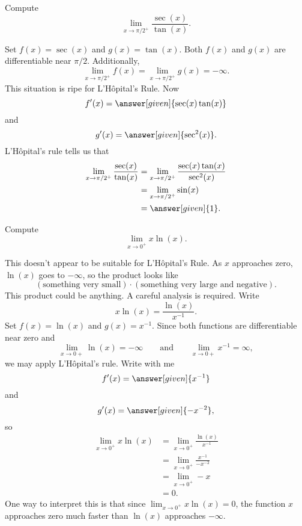 \documentclass{ximera}
\begin{document}
\begin{example}
  Compute 
\[
\lim_{x\to \pi/2^+} \frac{\sec(x)}{\tan(x)}.
\]
\begin{explanation}
Set $f(x) = \sec(x)$ and $g(x) = \tan(x)$. Both $f(x)$ and $g(x)$
are differentiable near $\pi/2$. Additionally,
\[
\lim_{x \to \pi/2^+} f(x) = \lim_{x \to \pi/2^+}g(x) = -\infty.
\]
This situation is ripe for L'H\^opital's Rule. Now 
\[
f'(x) = \answer[given]{\sec(x)\tan(x)}
\]
and
\[
g'(x) = \answer[given]{\sec^2(x)}.
\]
L'H\^{o}pital's rule tells us that 
\begin{align*}
\lim_{x\to \pi/2^+} \frac{\sec(x)}{\tan(x)} &= \lim_{x\to \pi/2^+}
\frac{\sec(x)\tan(x)}{\sec^2(x)} \\
&= \lim_{x\to \pi/2^+} \sin(x)\\
&=\answer[given]{1}.
\end{align*}
\end{explanation}
\end{example}



\begin{example}\label{example:xlnx infty} 
Compute 
\[
\lim_{x\to 0^+} x\ln(x).
\]
\begin{explanation}
This doesn't appear to be suitable for L'H\^{o}pital's Rule. As $x$
approaches zero, $\ln(x)$ goes to $-\infty$, so the product looks like
\[
(\text{something very small})\cdot (\text{something very large and
  negative}).
\] 
This product could be anything. A careful analysis is required.
Write
\[
x\ln(x) = \frac{\ln(x)}{x^{-1}}.
\]
Set $f(x) = \ln(x)$ and $g(x) = x^{-1}$.  Since both functions are differentiable near zero and 
\[
\lim_{x\to 0+} \ln(x) = -\infty\qquad\text{and}\qquad \lim_{x\to 0+} x^{-1} = \infty,
\]
we may apply L'H\^{o}pital's rule. Write with me
\[
f'(x) = \answer[given]{x^{-1}}
\]
and
\[
g'(x) = \answer[given]{-x^{-2}},
\]
so
\begin{align*}
  \lim_{x\to 0^+} x\ln(x) &= \lim_{x\to 0^+} \frac{\ln(x)}{x^{-1}} \\
  &= \lim_{x\to 0^+} \frac{x^{-1}}{-x^{-2}}\\
  &=\lim_{x\to 0^+} -x \\
  &= 0.
\end{align*}
One way to interpret this is that since $\lim_{x\to 0^+}x\ln(x) = 0$,
the function $x$ approaches zero much faster than $\ln(x)$ approaches
$-\infty$.
\end{explanation}
\end{example}
\end{document}
